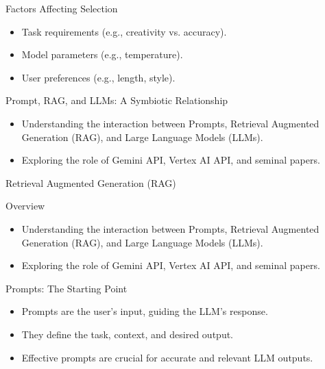 \documentclass{beamer}
\begin{document}
\begin{frame}{Factors Affecting Selection}
  \begin{itemize}
    \item Task requirements (e.g., creativity vs. accuracy).
    \item Model parameters (e.g., temperature).
    \item User preferences (e.g., length, style).
  \end{itemize}
\end{frame}


\begin{frame}{Prompt, RAG, and LLMs: A Symbiotic Relationship}
  \begin{itemize}
    \item Understanding the interaction between Prompts, Retrieval Augmented Generation (RAG), and Large Language Models (LLMs).
    \item Exploring the role of Gemini API, Vertex AI API, and seminal papers.
  \end{itemize}
\end{frame}

\begin{frame}
\Huge
\centering
Retrieval Augmented Generation (RAG)
\end{frame}



\begin{frame}{Overview}
  \begin{itemize}
    \item Understanding the interaction between Prompts, Retrieval Augmented Generation (RAG), and Large Language Models (LLMs).
    \item Exploring the role of Gemini API, Vertex AI API, and seminal papers.
  \end{itemize}
\end{frame}

\begin{frame}{Prompts: The Starting Point}
  \begin{itemize}
    \item Prompts are the user's input, guiding the LLM's response.
    \item They define the task, context, and desired output.
    \item Effective prompts are crucial for accurate and relevant LLM outputs.
  \end{itemize}
\end{frame}
\end{document}
